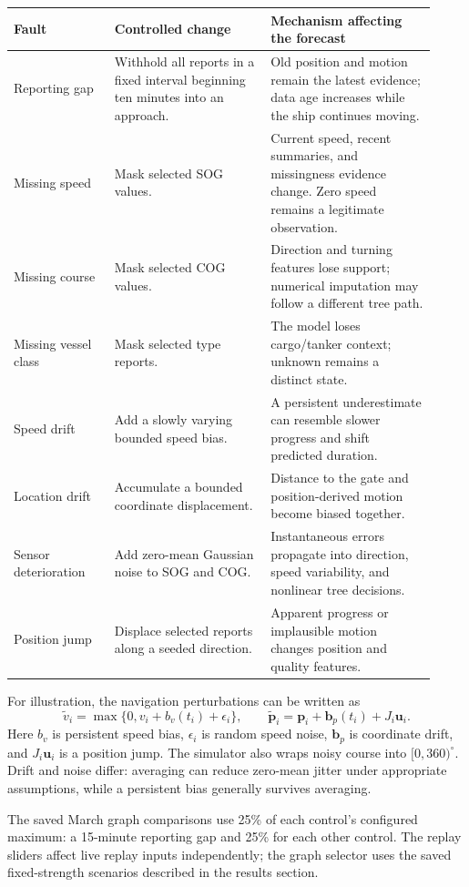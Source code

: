 \documentclass[11pt]{article}
\begin{document}
\begin{longtable}{@{}p{0.22\linewidth}p{0.34\linewidth}p{0.36\linewidth}@{}}
\toprule
Fault & Controlled change & Mechanism affecting the forecast \\
\midrule
\endhead
Reporting gap & Withhold all reports in a fixed interval beginning ten minutes into an approach. & Old position and motion remain the latest evidence; data age increases while the ship continues moving. \\
Missing speed & Mask selected SOG values. & Current speed, recent summaries, and missingness evidence change. Zero speed remains a legitimate observation. \\
Missing course & Mask selected COG values. & Direction and turning features lose support; numerical imputation may follow a different tree path. \\
Missing vessel class & Mask selected type reports. & The model loses cargo/tanker context; unknown remains a distinct state. \\
Speed drift & Add a slowly varying bounded speed bias. & A persistent underestimate can resemble slower progress and shift predicted duration. \\
Location drift & Accumulate a bounded coordinate displacement. & Distance to the gate and position-derived motion become biased together. \\
Sensor deterioration & Add zero-mean Gaussian noise to SOG and COG. & Instantaneous errors propagate into direction, speed variability, and nonlinear tree decisions. \\
Position jump & Displace selected reports along a seeded direction. & Apparent progress or implausible motion changes position and quality features. \\
\bottomrule
\end{longtable}

For illustration, the navigation perturbations can be written as
\[
 \widetilde v_i=\max\{0,v_i+b_v(t_i)+\epsilon_i\},\qquad
 \widetilde{\mathbf p}_i=\mathbf p_i+\mathbf b_p(t_i)+J_i\mathbf u_i.
\]
Here $b_v$ is persistent speed bias, $\epsilon_i$ is random speed noise, $\mathbf b_p$ is coordinate drift, and $J_i\mathbf u_i$ is a position jump. The simulator also wraps noisy course into $[0,360)^\circ$. Drift and noise differ: averaging can reduce zero-mean jitter under appropriate assumptions, while a persistent bias generally survives averaging.

The saved March graph comparisons use 25\% of each control's configured maximum: a 15-minute reporting gap and 25\% for each other control. The replay sliders affect live replay inputs independently; the graph selector uses the saved fixed-strength scenarios described in the results section.
\end{document}
